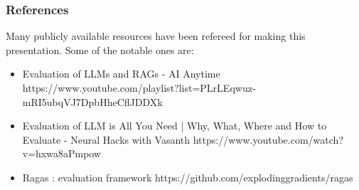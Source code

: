 \begin{frame}\frametitle{References}
Many publicly available resources have been refereed for making this presentation. Some of the notable ones are:
\footnotesize
\begin{itemize}
\item Evaluation of LLMs and RAGs - AI Anytime https://www.youtube.com/playlist?list=PLrLEqwuz-mRI5ubqVJ7DpbHheCflJDDXk
\item Evaluation of LLM is All You Need | Why, What, Where and How to Evaluate - Neural Hacks with Vasanth https://www.youtube.com/watch?v=hxwa8aPmpow
\item Ragas : evaluation framework 	 https://github.com/explodinggradients/ragas
\end{itemize}

\end{frame}